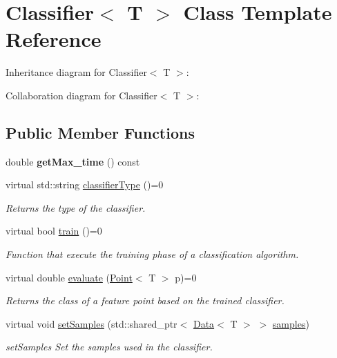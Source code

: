 \hypertarget{class_classifier}{}\section{Classifier$<$ T $>$ Class Template Reference}
\label{class_classifier}


Inheritance diagram for Classifier$<$ T $>$\+:


Collaboration diagram for Classifier$<$ T $>$\+:
\subsection*{Public Member Functions}
\begin{DoxyCompactItemize}
\item 
\mbox{\label{class_classifier_ae59109832c17394f457baa92b910a55d}} 
double {\bfseries get\+Max\+\_\+time} () const
\item 
virtual std\+::string \mbox{\hyperlink{class_classifier_ab40f42f957ec50939bd9a6b0cd5d1786}{classifier\+Type}} ()=0
\begin{DoxyCompactList}\small\item\em Returns the type of the classifier. \end{DoxyCompactList}\item 
virtual bool \mbox{\hyperlink{class_classifier_a120849bfdfa3ba7a0388b32b2d76bf4f}{train}} ()=0
\begin{DoxyCompactList}\small\item\em Function that execute the training phase of a classification algorithm. \end{DoxyCompactList}\item 
virtual double \mbox{\hyperlink{class_classifier_ab3b9544a8d9c3cbde8d5865c7e9be0fb}{evaluate}} (\mbox{\hyperlink{class_point}{Point}}$<$ T $>$ p)=0
\begin{DoxyCompactList}\small\item\em Returns the class of a feature point based on the trained classifier. \end{DoxyCompactList}\item 
virtual void \mbox{\hyperlink{class_classifier_ad32dac7fcf649c5642c39f2ea22f3fde}{set\+Samples}} (std\+::shared\+\_\+ptr$<$ \mbox{\hyperlink{class_data}{Data}}$<$ T $>$ $>$ \mbox{\hyperlink{class_classifier_a0000b47a2e0784ada4c52d7046c4adb8}{samples}})
\begin{DoxyCompactList}\small\item\em set\+Samples Set the samples used in the classifier. \end{DoxyCompactList}\item 

\end{DoxyCompactItemize}
